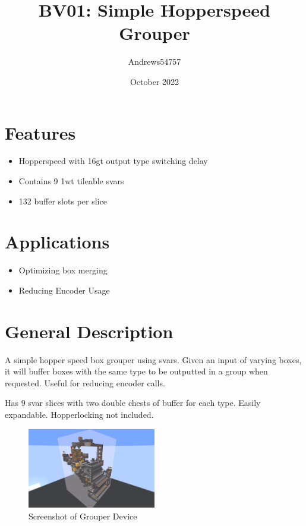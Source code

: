 \documentclass[10pt]{datasheet}
\title{BV01: Simple Hopperspeed Grouper}
\author{Andrews54757}
\date{October 2022}
\begin{document}
\maketitle

\section{Features}

\begin{itemize}
\item{Hopperspeed with 16gt output type switching delay}
\item{Contains 9 1wt tileable svars}
\item{132 buffer slots per slice}
\end{itemize}

\section{Applications}

\begin{itemize}
\item{Optimizing box merging}
\item{Reducing Encoder Usage}
\end{itemize}

\section{General Description}
A simple hopper speed box grouper using svars. Given an input of varying boxes, it will buffer boxes with the same type to be outputted in a group when requested. Useful for reducing encoder calls. 

Has 9 svar slices with two double chests of buffer for each type. Easily expandable. Hopperlocking not included.

\vfill\break

\begin{figure}[h]
    \includegraphics[width=0.5\textwidth]{grouper.png}
    \caption{Screenshot of Grouper Device}
\end{figure}
\end{document}
